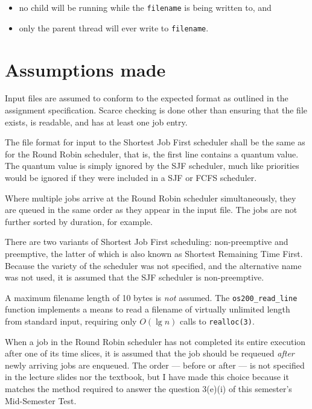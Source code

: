 \documentclass[a4paper,12pt,titlepage]{article}
\begin{document}
\begin{itemize}
	\item no child will be running while the \texttt{filename} is being
	      written to, and
	\item only the parent thread will ever write to \texttt{filename}.
\end{itemize}

\newpage

\section{Assumptions made}

Input files are assumed to conform to the expected format as outlined in the
assignment specification. Scarce checking is done other than ensuring that the
file exists, is readable, and has at least one job entry.

The file format for input to the Shortest Job First scheduler shall be the same
as for the Round Robin scheduler, that is, the first line contains a quantum
value. The quantum value is simply ignored by the SJF scheduler, much like
priorities would be ignored if they were included in a SJF or FCFS scheduler.

Where multiple jobs arrive at the Round Robin scheduler simultaneously, they
are queued in the same order as they appear in the input file. The jobs are not
further sorted by duration, for example.

There are two variants of Shortest Job First scheduling: non-preemptive and
preemptive, the latter of which is also known as Shortest Remaining Time First.
Because the variety of the scheduler was not specified, and the alternative
name was not used, it is assumed that the SJF scheduler is non-preemptive.

A maximum filename length of 10 bytes is \textit{not} assumed. The
\texttt{os200\_read\_line} function implements a means to read a filename of
virtually unlimited length from standard input, requiring only $O(\lg n)$ calls
to \texttt{realloc(3)}.

When a job in the Round Robin scheduler has not completed its entire execution
after one of its time slices, it is assumed that the job should be requeued
\textit{after} newly arriving jobs are enqueued. The order --- before or after
--- is not specified in the lecture slides nor the textbook, but I have made
this choice because it matches the method required to answer the question
3(e)(i) of this semester's Mid-Semester Test.
\end{document}
